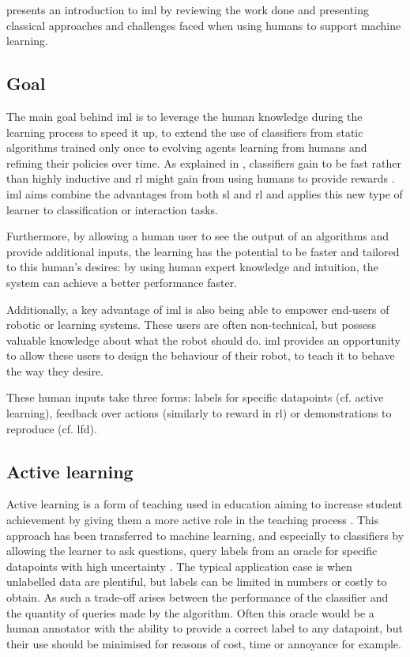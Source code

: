 \cite{amershi2014power} presents an introduction to \gls{iml} by reviewing the work done and presenting classical approaches and challenges faced when using humans to support machine learning.

\subsection{Goal}

The main goal behind \gls{iml} is to leverage the human knowledge during the learning process to speed it up, to extend the use of classifiers from static algorithms trained only once to evolving agents learning from humans and refining their policies over time. As explained in \cite{fails2003interactive}, classifiers gain to be fast rather than highly inductive and \gls{rl} might gain from using humans to provide rewards \citep{knox2009interactively}. \gls{iml} aims combine the advantages from both \gls{sl} and \gls{rl} and applies this new type of learner to classification or interaction tasks.

Furthermore, by allowing a human user to see the output of an algorithms and provide additional inputs, the learning has the potential to be faster and tailored to this human's desires: by using human expert knowledge and intuition, the system can achieve a better performance faster.

Additionally, a key advantage of \gls{iml} is also being able to empower end-users of robotic or learning systems. These users are often non-technical, but possess valuable knowledge about what the robot should do. \gls{iml} provides an opportunity to allow these users to design the behaviour of their robot, to teach it to behave the way they desire.

These human inputs take three forms: labels for specific datapoints (cf. active learning), feedback over actions (similarly to reward in \gls{rl}) or demonstrations to reproduce (cf. \gls{lfd}).

\subsection{Active learning} \label{ssec:back_active}

Active learning is a form of teaching used in education aiming to increase student achievement by giving them a more active role in the teaching process \citep{johnson1991active}. This approach has been transferred to machine learning, and especially to classifiers by allowing the learner to ask questions, query labels from an oracle for specific datapoints with high uncertainty \citep{settles2012active}. The typical application case is when unlabelled data are plentiful, but labels can be limited in numbers or costly to obtain. As such a trade-off arises between the performance of the classifier and the quantity of queries made by the algorithm. Often this oracle would be a human annotator with the ability to provide a correct label to any datapoint, but their use should be minimised for reasons of cost, time or annoyance for example.

